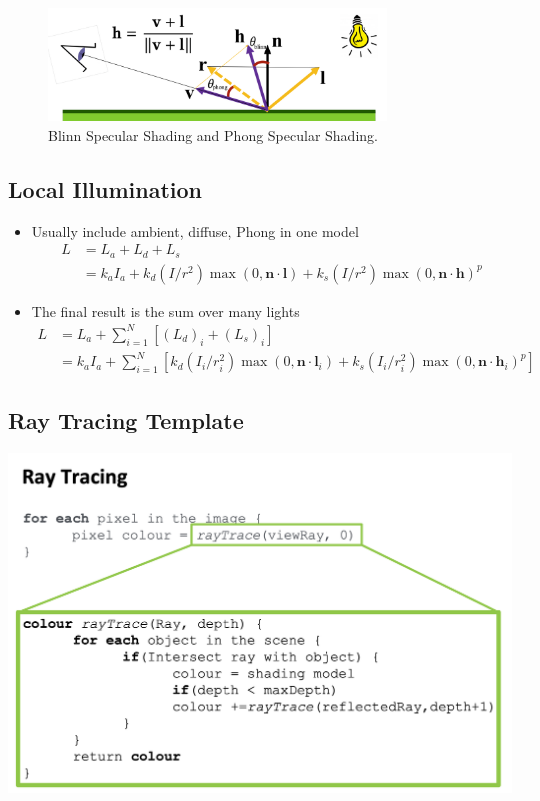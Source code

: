 \documentclass[11pt]{article}
\begin{document}
\begin{figure}
	\centering\includegraphics[width=0.8\textwidth]{figs/blinn}
	\caption{\label{blinn} Blinn Specular Shading and Phong Specular Shading.}
\end{figure}

\subsection{Local Illumination}
\begin{itemize}
	\item Usually include ambient, diffuse, Phong in one model
	\begin{equation}
		\begin{aligned}
			L &=L_{a}+L_{d}+L_{s} \\
			&=k_{a} I_{a}+k_{d}\left(I / r^{2}\right) \max (0, \mathbf{n} \cdot \mathbf{l})+k_{s}\left(I / r^{2}\right) \max (0, \mathbf{n} \cdot \mathbf{h})^{p}
		\end{aligned}
	\end{equation}
	\item The final result is the sum over many lights
	\begin{align}
		L
		&= L_{a}+\sum_{i=1}^{N}\left[\left(L_{d}\right)_{i}+\left(L_{s}\right)_{i}\right] \\
		&=k_{a} I_{a}+\sum_{i=1}^{N}\left[k_{d}\left(I_{i} / r_{i}^{2}\right) \max \left(0, \mathbf{n} \cdot \mathbf{l}_{i}\right)+
		k_{s}\left(I_{i} / r_{i}^{2}\right) \max \left(0, \mathbf{n} \cdot \mathbf{h}_{i}\right)^{p}\right]
	\end{align}
\end{itemize}

\subsection{Ray Tracing Template}
{\center \includegraphics[width=1.0\textwidth]{figs/ray trace}}
\end{document}
